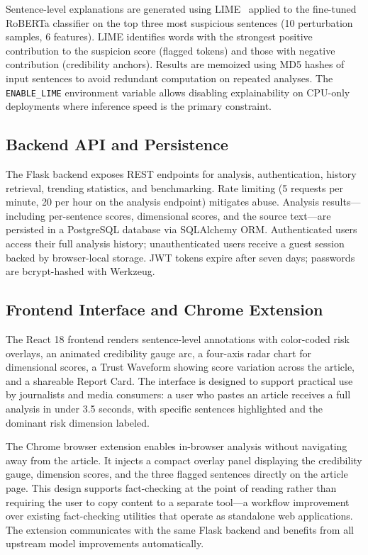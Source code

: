 \documentclass[journal]{IEEEtran}
\begin{document}
Sentence-level explanations are generated using LIME~\cite{ribeiro2016trust} applied to the
fine-tuned RoBERTa classifier on the top three most suspicious sentences (10 perturbation
samples, 6 features). LIME identifies words with the strongest positive contribution to the
suspicion score (flagged tokens) and those with negative contribution (credibility anchors).
Results are memoized using MD5 hashes of input sentences to avoid redundant computation on
repeated analyses. The \texttt{ENABLE\_LIME} environment variable allows disabling
explainability on CPU-only deployments where inference speed is the primary constraint.

\subsection{Backend API and Persistence}

The Flask backend exposes REST endpoints for analysis, authentication, history retrieval,
trending statistics, and benchmarking. Rate limiting (5 requests per minute, 20 per hour on
the analysis endpoint) mitigates abuse. Analysis results—including per-sentence scores,
dimensional scores, and the source text—are persisted in a PostgreSQL database via
SQLAlchemy ORM. Authenticated users access their full analysis history; unauthenticated
users receive a guest session backed by browser-local storage. JWT tokens expire after seven
days; passwords are bcrypt-hashed with Werkzeug.

\subsection{Frontend Interface and Chrome Extension}

The React 18 frontend renders sentence-level annotations with color-coded risk overlays, an
animated credibility gauge arc, a four-axis radar chart for dimensional scores, a Trust
Waveform showing score variation across the article, and a shareable Report Card. The
interface is designed to support practical use by journalists and media consumers: a user
who pastes an article receives a full analysis in under 3.5 seconds, with specific sentences
highlighted and the dominant risk dimension labeled.

The Chrome browser extension enables in-browser analysis without navigating away from the
article. It injects a compact overlay panel displaying the credibility gauge, dimension
scores, and the three flagged sentences directly on the article page. This design supports
fact-checking at the point of reading rather than requiring the user to copy content to a
separate tool—a workflow improvement over existing fact-checking utilities that operate as
standalone web applications. The extension communicates with the same Flask backend and
benefits from all upstream model improvements automatically.
\end{document}
